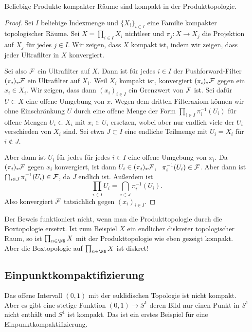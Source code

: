 \begin{theorem}[Tychonoff]\label{thm:tychonoff}
Beliebige Produkte kompakter Räume sind kompakt in der Produkttopologie.
\end{theorem}
\begin{proof}
Sei $I$ beliebige Indexmenge und $\{X_i\}_{i\in I}$ eine Familie kompakter topologischer Räume. Sei $X = \prod_{i\in I} X_i$ nichtleer und $\pi_j\colon X\to X_j$ die Projektion auf $X_j$ für jedes $j\in I$. Wir zeigen, dass $X$ kompakt ist, indem wir zeigen, dass jeder Ultrafilter in $X$ konvergiert.

Sei also $\cal F$ ein Ultrafilter auf $X$. Dann ist für jedes $i\in I$ der Pushforward-Filter $(\pi_i)_*\cal F$ ein Ultrafilter auf $X_i$. Weil $X_i$ kompakt ist, konvergiert $(\pi_i)_*\cal F$ gegen ein $x_i\in X_i$. Wir zeigen, dass dann $(x_i)_{i\in I}$ ein Grenzwert von $\cal F$ ist. Sei dafür $U\subset X$ eine offene Umgebung von $x$. Wegen dem dritten Filteraxiom können wir ohne Einschränkung $U$ durch eine offene Menge der Form $\prod_{i\in I}\pi_i^{-1}(U_i)$ für offene Mengen $U_i\subset X_i$ mit $x_i\in U_i$ ersetzen, wobei aber nur endlich viele der $U_i$ verschieden von $X_i$ sind. Sei etwa $J\subset I$ eine endliche Teilmenge mit $U_i = X_i$ für $i\not\in J$.

Aber dann ist $U_i$ für jedes für jedes $i\in I$ eine offene Umgebung von $x_i$. Da $(\pi_i)_*\cal F$ gegen $x_i$ konvergiert, ist dann $U_i\in (\pi_i)_*\cal F$, \ddh~$\pi_i^{-1}(U_i)\in\cal F$. Aber dann ist $\bigcap_{i\in J} \pi_i^{-1}(U_i)\in\cal F$, da $J$ endlich ist. Außerdem ist
\[
\prod_{i\in I} U_i = \bigcap_{i\in J}\pi_i^{-1}(U_i).
\]
Also konvergiert $\cal F$ tatsächlich gegen $(x_i)_{i\in I}$.
\end{proof}

Der Beweis funktioniert nicht, wenn man die Produkttopologie durch die Boxtopologie ersetzt. Ist zum Beispiel $X$ ein endlicher diskreter topologischer Raum, so ist $\prod_{n\in\NN} X$ mit der Produkttopologie wie eben gezeigt kompakt. Aber die Boxtopologie auf $\prod_{n\in\NN} X$ ist diskret!

\subsection{Einpunktkompaktifizierung}
Das offene Intervall $(0,1)$ mit der euklidischen Topologie ist nicht kompakt. Aber es gibt eine stetige Funktion $(0,1)\to S^1$ deren Bild nur einen Punkt in $S^1$ nicht enthält und $S^1$ ist kompakt. Das ist ein erstes Beispiel für eine Einpunktkompaktifizierung.

